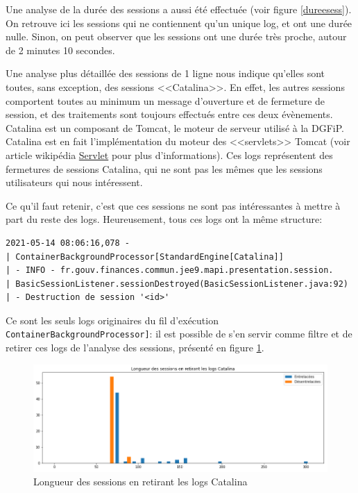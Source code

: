 \documentclass[openany, 11pt]{memoir}
\begin{document}
Une analyse de la durée des sessions a aussi été effectuée (voir figure \ref{dureesess}). On retrouve ici les sessions qui ne contiennent qu'un unique \gls{log}, et ont une durée nulle. Sinon, on peut observer que les sessions ont une durée très proche, autour de 2 minutes 10 secondes.

\bigskip
Une analyse plus détaillée des sessions de 1 ligne nous indique qu'elles sont toutes, sans exception, des sessions <<Catalina>>. En effet, les autres sessions comportent toutes au minimum un message d'ouverture et de fermeture de session, et des traitements sont toujours effectués entre ces deux évènements. Catalina est un composant de Tomcat, le moteur de serveur utilisé à la DGFiP. Catalina est en fait l'implémentation du moteur des <<servlets>> Tomcat (voir article wikipédia \href{https://fr.wikipedia.org/wiki/Servlet}{Servlet} pour plus d'informations). Ces \glspl{log} représentent des fermetures de sessions Catalina, qui ne sont pas les mêmes que les sessions utilisateurs qui nous intéressent.

Ce qu'il faut retenir, c'est que ces sessions ne sont pas intéressantes à mettre à part du reste des \glspl{log}. Heureusement, tous ces logs ont la même structure:

\begin{lstlisting}
2021-05-14 08:06:16,078 -
| ContainerBackgroundProcessor[StandardEngine[Catalina]]
| - INFO - fr.gouv.finances.commun.jee9.mapi.presentation.session.
| BasicSessionListener.sessionDestroyed(BasicSessionListener.java:92)
| - Destruction de session '<id>'
\end{lstlisting}

Ce sont les seuls \glspl{log} originaires du fil d'exécution \texttt{ContainerBackgroundProcessor\allowbreak [Stan\-dard\allowbreak Engine[Catalina]]}: il est possible de s'en servir comme filtre et de retirer ces logs de l'analyse des sessions, présenté en figure \ref{longsesscata}.

\begin{figure}[ht]
	\centering
	\includegraphics[width=\textwidth]{images/longsesscata.png}
	\caption{Longueur des sessions en retirant les logs Catalina}
	\label{longsesscata}
\end{figure}
\end{document}
